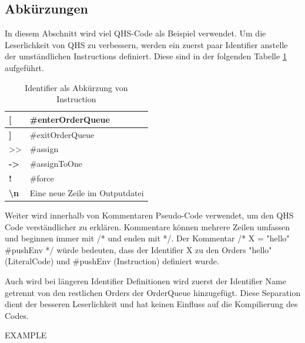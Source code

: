 \subsection{Abkürzungen}
In diesem Abschnitt wird viel QHS-Code als Beispiel verwendet.
Um die Leserlichkeit von QHS zu verbessern, werden ein zuerst paar Identifier anstelle der umständlichen Instructions definiert.
Diese sind in der folgenden Tabelle \ref{tab:shortcuts} aufgeführt.

{
\begin{table}[H]
    \centering
    \caption{Identifier als Abkürzung von Instruction}
    \vspace{3mm} %
    \label{tab:shortcuts}
    
    \begin{tabular}{>{\listingFont\selectfont}l|l}
    \textbf{{[}}                 & \#enterOrderQueue              \\ \hline
    \textbf{{]}}                 & \#exitOrderQueue               \\ \hline
    \textgreater{}\textgreater{} & \#assign                       \\ \hline
    \textbf{-\textgreater{}}     & \#assignToOne                  \\ \hline
    \textbf{!}                   & \#force                        \\ \hline
    \textbf{\textbackslash{}n}   & Eine neue Zeile im Outputdatei
    \end{tabular}
\end{table}
}

Weiter wird innerhalb von Kommentaren Pseudo-Code verwendet, um den QHS Code verständlicher zu erklären. Kommentare können mehrere Zeilen umfassen und beginnen immer mit /* und enden mit */.
Der Kommentar /* X = "hello" \#pushEnv */ würde bedeuten, dass der Identifier X zu den Orders "hello" (LiteralCode) und \#pushEnv (Instruction) definiert wurde. 

Auch wird bei längeren Identifier Definitionen wird zuerst der Identifier Name getrennt von den restlichen Orders der OrderQueue hinzugefügt.
Diese Separation dient der besseren Leserlichkeit und hat keinen Einfluss auf die Kompilierung des Codes.

EXAMPLE

